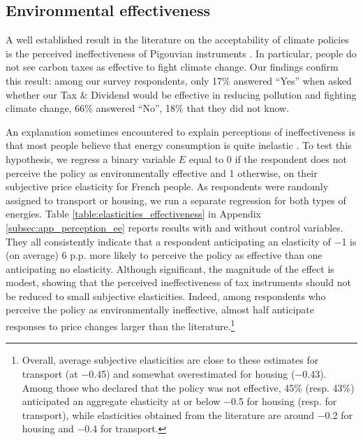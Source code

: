\documentclass[12pt]{article} %
\begin{document}
    \subsection{Environmental effectiveness}

A well established result in the literature on the acceptability of climate policies is the perceived ineffectiveness of Pigouvian instruments \citep[e.g.][]{dresner_social_2006,kallbekken_et_al_2011, baranzini_effectiveness_2017}. In particular, people do not see carbon taxes as effective to fight climate change. Our findings confirm this result: among our survey respondents, only 17\% answered ``Yes'' when asked whether our Tax \& Dividend would be effective in reducing pollution and fighting climate change, 66\% answered ``No'', 18\% that they did not know.

An explanation sometimes encountered to explain perceptions of ineffectiveness is that most people believe that energy consumption is quite inelastic \citep{kallbekken_saelen_2011,carattini_overcoming_2018}. To test this hypothesis, we regress a binary variable $E$ equal to 0 if the respondent does not perceive the policy as environmentally effective and 1 otherwise, on their subjective price elasticity for French people. As respondents were randomly assigned to transport or housing, we run a separate regression for both types of energies. Table \ref{table:elasticities_effectiveness} in Appendix \ref{subsec:app_perception_ee} reports results with and without control variables. They all consistently indicate that a respondent anticipating an elasticity of $-$1 is (on average) 6 p.p. more likely to perceive the policy as effective than one anticipating no elasticity. Although significant, the magnitude of the effect is modest, showing that the perceived ineffectiveness of tax instruments should not be reduced to small subjective elasticities. Indeed, among respondents who perceive the policy as environmentally ineffective, almost half anticipate responses to price changes larger than the literature.\footnote{Overall, average subjective elasticities are close to these estimates for transport (at $-$0.45) and somewhat overestimated for housing ($-$0.43). Among those who declared that the policy was not effective, 45\% (resp. 43\%) anticipated an aggregate elasticity at or below $-$0.5 for housing (resp. for transport), while elasticities obtained from the literature are around $-$0.2 for housing and $-$0.4 for transport.\label{fnel}}
\end{document}
